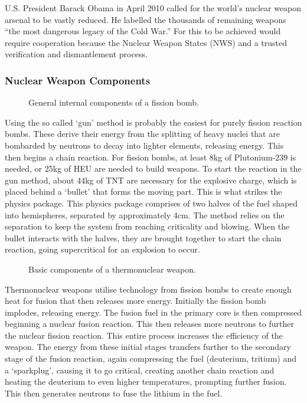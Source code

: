 \documentclass[twoside,titlepage,11pt,twocolumn,a4paper]{article}
\begin{document}
U.S. President Barack Obama in April 2010 called for the world's
nuclear weapon arsenal to be vastly reduced. He labelled the thousands
of remaining weapons ``the most dangerous legacy of the Cold War.''
For this to be achieved would require cooperation because the Nuclear
Weapon States (NWS) and a trusted verification and dismantlement
process.

\subsubsection{Nuclear Weapon Components}
\begin{figure}
   
  \caption{General internal components of a fission
    bomb. \citep{fissionBomb}}
\end{figure}

Using the so called `gun' method is probably the easiest for purely
fission reaction bombs. These derive their energy from the splitting
of heavy nuclei that are bombarded by neutrons to decay into lighter
elements, releasing energy. This then begins a chain reaction. For
fission bombs, at least 8kg of Plutonium-239 is needed, or 25kg of HEU
are needed to build weapons. \citep{cochran1995} To start the reaction
in the gun method, about 44kg of TNT are necessary
\citep{howToMakeBomb} for the explosive charge, which is placed behind
a `bullet' that forms the moving part. This is what strikes the
physics package. This physics package comprises of two halves of the
fuel shaped into hemispheres, separated by approximately 4cm. The
method relies on the separation to keep the system from reaching
criticality and blowing. When the bullet interacts with the halves,
they are brought together to start the chain reaction, going
supercritical for an explosion to occur.

\begin{figure}
  
  \caption{Basic components of a thermonuclear weapon.
    \citep{thermonuclearBomb}}
\end{figure}

Thermonuclear weapons utilise technology from fission bombs to create
enough heat for fusion that then releases more energy.  Initially the
fission bomb implodes, releasing energy. The fusion fuel in the
primary core is then compressed beginning a nuclear fusion
reaction. This then releases more neutrons to further the nuclear
fission reaction. This entire process increases the efficiency of the
weapon. The energy from these initial stages transfers further to the
secondary stage of the fusion reaction, again compressing the fuel
(deuterium, tritium) and a `sparkplug', causing it to go critical,
creating another chain reaction and heating the deuterium to even
higher temperatures, prompting further fusion. This then generates
neutrons to fuse the lithium in the fuel.
\end{document}
